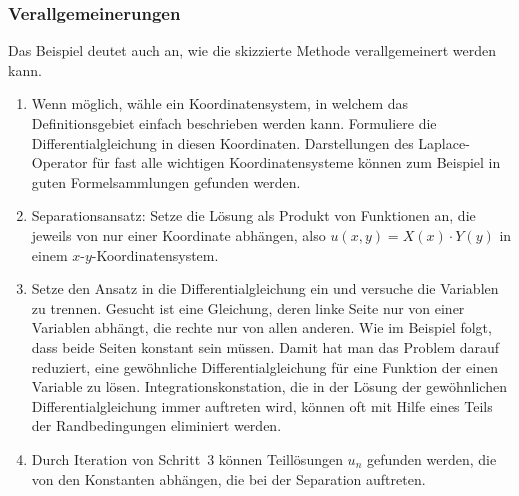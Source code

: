 \subsubsection{Verallgemeinerungen}
Das Beispiel deutet auch an, wie die skizzierte Methode verallgemeinert
werden kann.
\begin{enumerate}
\item
Wenn möglich, wähle ein Koordinatensystem, in welchem das Definitionsgebiet
einfach beschrieben werden kann.
Formuliere die Differentialgleichung in diesen Koordinaten.
Darstellungen des Laplace-Operator für fast alle wichtigen Koordinatensysteme
können zum Beispiel in guten Formelsammlungen gefunden werden.
\item
Separationsansatz: Setze die Lösung als Produkt von Funktionen an,
die jeweils von nur einer Koordinate abhängen, also
$u(x,y)=X(x)\cdot Y(y)$ in einem $x$-$y$-Koordinatensystem.
\item
Setze den Ansatz in die Differentialgleichung ein und versuche die
Variablen zu trennen. 
Gesucht ist eine Gleichung, deren linke Seite nur von einer Variablen
abhängt, die rechte nur von allen anderen.
Wie im Beispiel folgt, dass beide Seiten konstant sein müssen.
Damit hat man das Problem darauf reduziert, eine gewöhnliche
Differentialgleichung für eine Funktion der einen Variable zu lösen.
Integrationskonstation, die in der Lösung der gewöhnlichen
Differentialgleichung immer auftreten wird, können oft mit Hilfe
eines Teils der Randbedingungen eliminiert werden.
\item
Durch Iteration von Schritt~3 können Teillösungen $u_n$ gefunden werden,
die von den Konstanten abhängen, die bei der Separation auftreten.
\end{enumerate}

